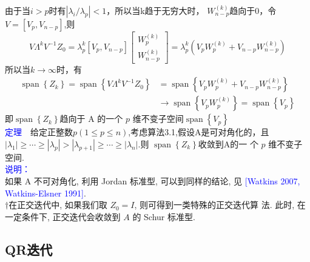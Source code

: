 \documentclass[12pt,a4paper]{article}
\begin{document}
由于当$i>p$时有$\left|\lambda_{i} / \lambda_{p}\right|<1$，所以当k趋于无穷大时，
$W_{n-p}^{(k)}$趋向于0，令$V=\left[V_{p}, V_{n-p}\right]$,则
$$V \Lambda^{k} V^{-1} Z_{0}=\lambda_{p}^{k}\left[V_{p}, V_{n-p}\right]\left[\begin{array}{c}{W_{p}^{(k)}} \\ {W_{n-p}^{(k)}}\end{array}\right]=\lambda_{p}^{k}\left(V_{p} W_{p}^{(k)}+V_{n-p} W_{n-p}^{(k)}\right)$$
所以当$k \rightarrow \infty$时，有
$$
\begin{aligned} \operatorname{span}\left\{Z_{k}\right\}=\operatorname{span}\left\{V \Lambda^{k} V^{-1} Z_{0}\right\} &=\operatorname{span}\left\{V_{p} W_{p}^{(k)}+V_{n-p} W_{n-p}^{(k)}\right\} \\ & \rightarrow \operatorname{span}\left\{V_{p} W_{p}^{(k)}\right\}=\operatorname{span}\left\{V_{p}\right\} \end{aligned}
$$
即$\operatorname{span}\left\{Z_{k}\right\}$趋向于 A 的一个 $p$ 维不变子空间$\operatorname{span}\left\{V_{p}\right\}$\\

\textcolor{blue}{定理}~~给定正整数$p(1 \leq p \leq n)$,考虑算法3.1,假设A是可对角化的，且$\left|\lambda_{1}\right| \geq \cdots \geq\left|\lambda_{p}\right|>\left|\lambda_{p+1}\right| \geq \cdots \geq\left|\lambda_{n}\right|$.则
$\operatorname{span}\left\{Z_{k}\right\}$收敛到A的一 个 $p$ 维不变子空间.\\
\textcolor{blue}{说明：}\\
如果 A 不可对角化, 利用 Jordan 标准型, 可以到同样的结论, 见 \textcolor{blue}{[Watkins 2007, Watkins-Elsner 1991]}.\\
$\dagger$在正交迭代中, 如果我们取 $Z_{0} = I$, 则可得到一类特殊的正交迭代算 法. 此时, 在一定条件下, 正交迭代会收敛到 $A$ 的 Schur 标准型.
\subsection{QR迭代}
\end{document}
